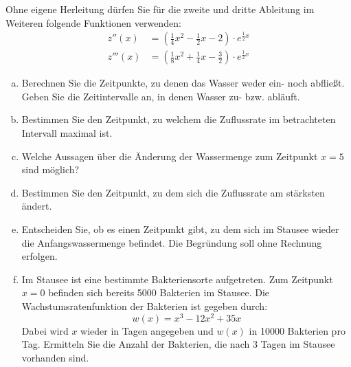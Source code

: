 \begin{exercise}
\begin{center}
    \end{center}
    Ohne eigene Herleitung dürfen Sie für die zweite und dritte Ableitung
    im Weiteren folgende Funktionen verwenden:
    \begin{equation*}
      \begin{split}
         z''(x)&=\left(\frac{1}{4}x^2-\frac{1}{2}x-2\right)\cdot e^{\frac{1}{2}x} \\[2ex]
        z'''(x)&=\left(\frac{1}{8}x^2+\frac{1}{4}x-\frac{3}{2}\right)\cdot e^{\frac{1}{2}x}
      \end{split}
    \end{equation*}
    \begin{enumerate}[a)]
      \item Berechnen Sie die Zeitpunkte, zu denen das Wasser weder ein- noch abfließt.
            Geben Sie die Zeitintervalle an, in denen Wasser zu- bzw. abläuft.
      \item Bestimmen Sie den Zeitpunkt, zu welchem die Zuflussrate im betrachteten
            Intervall maximal ist.
      \item Welche Aussagen über die Änderung der Wassermenge zum Zeitpunkt
            $x=5$ sind möglich?
      \item Bestimmen Sie den Zeitpunkt, zu dem sich die Zuflussrate am stärksten ändert.
      \item Entscheiden Sie, ob es einen Zeitpunkt gibt, zu dem sich im Stausee wieder
            die Anfangswassermenge befindet. Die Begründung soll ohne Rechnung erfolgen.
      \item Im Stausee ist eine bestimmte Bakteriensorte aufgetreten.
            Zum Zeitpunkt $x=0$ befinden sich bereits \num{5000} Bakterien im Stausee.
            Die Wachstumsratenfunktion der Bakterien ist gegeben durch:
            \begin{equation*}
              w(x)=x^3-12x^2+35x
            \end{equation*}
            Dabei wird $x$ wieder in Tagen angegeben und $w(x)$ in \num{10000} Bakterien pro Tag.
            Ermitteln Sie die Anzahl der Bakterien, die nach 3 Tagen im Stausee vorhanden sind.
    \end{enumerate}
  \fi
\end{exercise}
